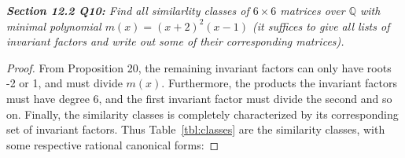 \documentclass{article}
\begin{document}
\it \textbf{Section 12.2 Q10:} Find all similarlity classes of $6\times6$
  matrices over $\mathbb{Q}$ with minimal polynomial $m(x)=(x+2)^2(x-1)$ (it
  suffices to give all lists of invariant factors and write out some of
  their corresponding matrices).

  \begin{proof}
    From Proposition 20, the remaining invariant factors can only have
    roots -2 or 1, and must divide $m(x)$. Furthermore, the products the
    invariant factors must have degree 6, and the first invariant factor
    must divide the second and so on. Finally, the similarity classes is
    completely characterized by its corresponding set of invariant factors.
    Thus Table~\ref{tbl:classes} are the similarity classes, with some
    respective rational canonical forms:


\end{proof}
\end{document}
